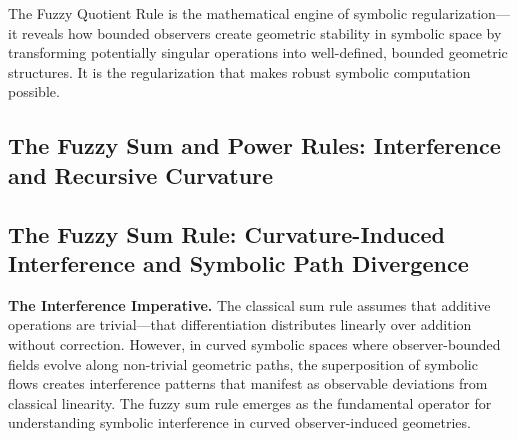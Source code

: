 The Fuzzy Quotient Rule is the mathematical engine of symbolic regularization—it reveals how bounded observers create geometric stability in symbolic space by transforming potentially singular operations into well-defined, bounded geometric structures. It is the regularization that makes robust symbolic computation possible.

\subsection{The Fuzzy Sum and Power Rules: Interference and Recursive Curvature}
\label{subsec:bk4_fuzzy_sum_power}

\subsection{The Fuzzy Sum Rule: Curvature-Induced Interference and Symbolic Path Divergence}
\label{subsec:bk4_fuzzy_sum_rule}

\textbf{The Interference Imperative.} The classical sum rule assumes that additive operations are trivial—that differentiation distributes linearly over addition without correction. However, in curved symbolic spaces where observer-bounded fields evolve along non-trivial geometric paths, the superposition of symbolic flows creates interference patterns that manifest as observable deviations from classical linearity. The fuzzy sum rule emerges as the fundamental operator for understanding symbolic interference in curved observer-induced geometries.

